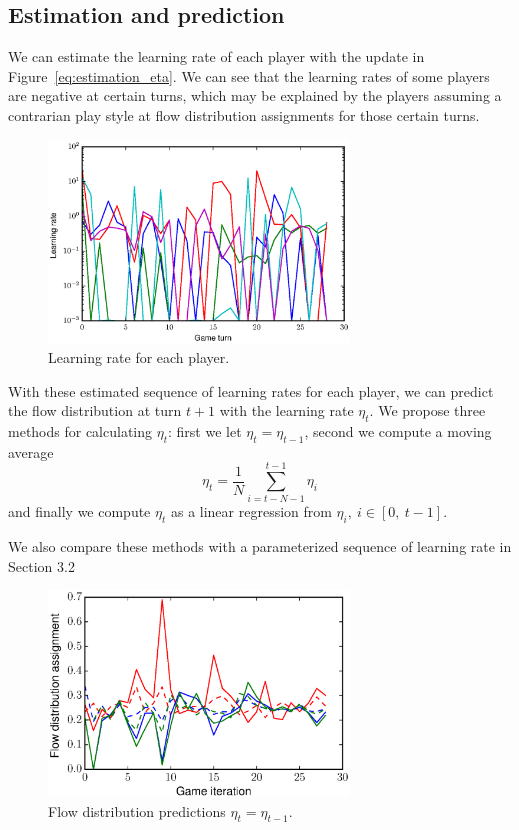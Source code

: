 \documentclass{sig-alternate-ipsn13}
\begin{document}
\subsection{Estimation and prediction}

We can estimate the learning rate of each player with the update in Figure~\ref{eq:estimation_eta}. We can see that the learning rates of some players are negative at certain turns, which may be explained by the players assuming a contrarian play style at flow distribution assignments for those certain turns.

\begin{figure}
  \centering
  \includegraphics[width=80mm]{images/learning_rates}
  \caption{Learning rate for each player.}
  \label{fig:learning_rates}
\end{figure}

With these estimated sequence of learning rates for each player, we can predict the flow distribution at turn $t+1$ with the learning rate $\eta_t$. We propose three methods for calculating $\eta_t$: first we let $\eta_t=\eta_{t-1}$, second we compute a moving average
\[
\eta_t=\dfrac{1}{N}\sum_{i=t-N-1}^{t-1}\eta_i
\] and finally we compute $\eta_t$ as a linear regression from $\eta_i,\ i \in [0,\ t-1]$.

We also compare these methods with a parameterized sequence of learning rate in Section 3.2

\begin{figure}
  \centering
  \includegraphics[width=80mm]{images/previous_eta_predictions}
  \caption{Flow distribution predictions $\eta_t = \eta_{t-1}$.}
  \label{fig:previous_eta_predictions}
\end{figure}
\end{document}
